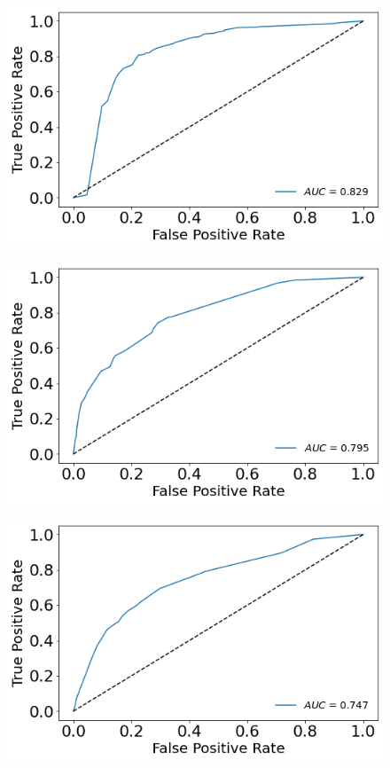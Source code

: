 \documentclass[a4paper,11pt,dvipsnames]{article}
\begin{document}
\begin{figure}[h]
\begin{minipage}[b]{.3\linewidth}
\centering\large \includegraphics[width=0.8\linewidth]{familiarity_ROC.png}
\label{fig:famroc}
\end{minipage}%
    \hfil
\begin{minipage}[b]{.3\linewidth}
\centering\includegraphics[width=0.8\linewidth]{semsize_ROC.png}\label{fig:semroc}
\end{minipage}    \hfil
\begin{minipage}[b]{.3\linewidth}
\centering\includegraphics[width=0.8\linewidth]{masculinity_ROC.png}\label{fig:masroc}
\end{minipage}


\end{figure}
\end{document}
